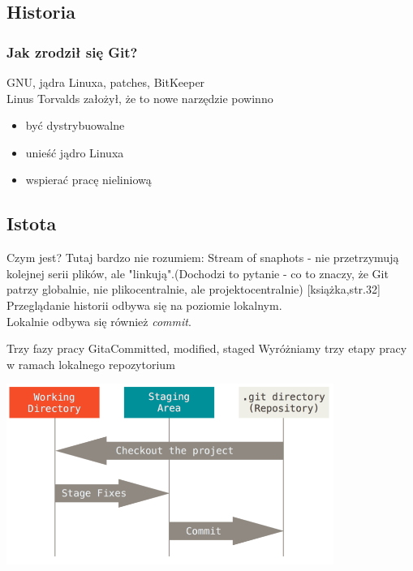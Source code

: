 \documentclass{beamer}
\begin{document}
\subsection{Historia}
\begin{frame}
 \frametitle{Jak zrodził się Git?}
GNU, jądra Linuxa, patches, BitKeeper \\
Linus Torvalds założył, że to nowe narzędzie powinno \\
  \begin{itemize}
  \item być dystrybuowalne
  \item unieść jądro Linuxa
  \item wspierać pracę nieliniową
 \end{itemize}
\end{frame}

\subsection{Istota}
\begin{frame}{Czym jest?}
 Tutaj bardzo nie rozumiem:
 Stream of snaphots - nie przetrzymują kolejnej serii plików, ale "linkują".(Dochodzi to pytanie - co to znaczy, że Git patrzy globalnie, nie plikocentralnie, ale projektocentralnie)
 [książka,str.32]\\
 Przeglądanie historii odbywa się na poziomie lokalnym.\\
 Lokalnie odbywa się również \textit{commit}.\\
\end{frame}

\begin{frame}{Trzy fazy pracy Gita}{Committed, modified, staged}
 Wyróżniamy trzy etapy pracy w ramach lokalnego repozytorium
  \begin{center}
   \includegraphics[width=0.8\textwidth]{./obrazki/fig-1_6.png}
 \end{center}
\end{frame}
\end{document}
